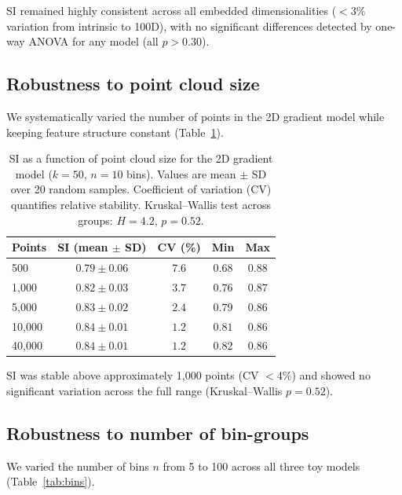 \documentclass[11pt]{article}
\begin{document}
SI remained highly consistent across all embedded dimensionalities ($<3\%$ variation from intrinsic to 100D), with no significant differences detected by one-way ANOVA for any model (all $p > 0.30$).

\subsection{Robustness to point cloud size}

We systematically varied the number of points in the 2D gradient model while keeping feature structure constant (Table~\ref{tab:cloud_size}).

\begin{table}[H]
\centering
\caption{SI as a function of point cloud size for the 2D gradient model ($k = 50$, $n = 10$ bins). Values are mean $\pm$ SD over 20 random samples. Coefficient of variation (CV) quantifies relative stability. Kruskal--Wallis test across groups: $H = 4.2$, $p = 0.52$.}
\label{tab:cloud_size}
\begin{tabular}{lcccc}
\toprule
\textbf{Points} & \textbf{SI (mean $\pm$ SD)} & \textbf{CV (\%)} & \textbf{Min} & \textbf{Max} \\
\midrule
500 & $0.79 \pm 0.06$ & $7.6$ & $0.68$ & $0.88$ \\
1{,}000 & $0.82 \pm 0.03$ & $3.7$ & $0.76$ & $0.87$ \\
5{,}000 & $0.83 \pm 0.02$ & $2.4$ & $0.79$ & $0.86$ \\
10{,}000 & $0.84 \pm 0.01$ & $1.2$ & $0.81$ & $0.86$ \\
40{,}000 & $0.84 \pm 0.01$ & $1.2$ & $0.82$ & $0.86$ \\
\bottomrule
\end{tabular}
\end{table}

SI was stable above approximately 1{,}000 points (CV $< 4\%$) and showed no significant variation across the full range (Kruskal--Wallis $p = 0.52$).

\subsection{Robustness to number of bin-groups}

We varied the number of bins $n$ from 5 to 100 across all three toy models (Table~\ref{tab:bins}).
\end{document}

